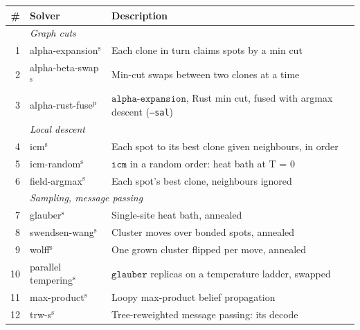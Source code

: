 \begin{tabular}{rll}
\toprule
\# & Solver & Description \\
\midrule
& \multicolumn{2}{l}{\emph{Graph cuts}} \\
1 & alpha-expansion$^{\mathrm{s}}$ & Each clone in turn claims spots by a min cut \\
2 & alpha-beta-swap$^{\mathrm{s}}$ & Min-cut swaps between two clones at a time \\
3 & alpha-rust-fuse$^{\mathrm{p}}$ & $\mathtt{alpha{\text{-}}expansion}$, Rust min cut, fused with argmax descent (\texttt{--sal}) \\
\addlinespace
& \multicolumn{2}{l}{\emph{Local descent}} \\
4 & icm$^{\mathrm{s}}$ & Each spot to its best clone given neighbours, in order \\
5 & icm-random$^{\mathrm{s}}$ & $\mathtt{icm}$ in a random order: heat bath at T = 0 \\
6 & field-argmax$^{\mathrm{s}}$ & Each spot's best clone, neighbours ignored \\
\addlinespace
& \multicolumn{2}{l}{\emph{Sampling, message passing}} \\
7 & glauber$^{\mathrm{s}}$ & Single-site heat bath, annealed \\
8 & swendsen-wang$^{\mathrm{s}}$ & Cluster moves over bonded spots, annealed \\
9 & wolff$^{\mathrm{s}}$ & One grown cluster flipped per move, annealed \\
10 & parallel tempering$^{\mathrm{s}}$ & $\mathtt{glauber}$ replicas on a temperature ladder, swapped \\
11 & max-product$^{\mathrm{s}}$ & Loopy max-product belief propagation \\
12 & trw-s$^{\mathrm{s}}$ & Tree-reweighted message passing: its decode \\
\bottomrule
\end{tabular}
